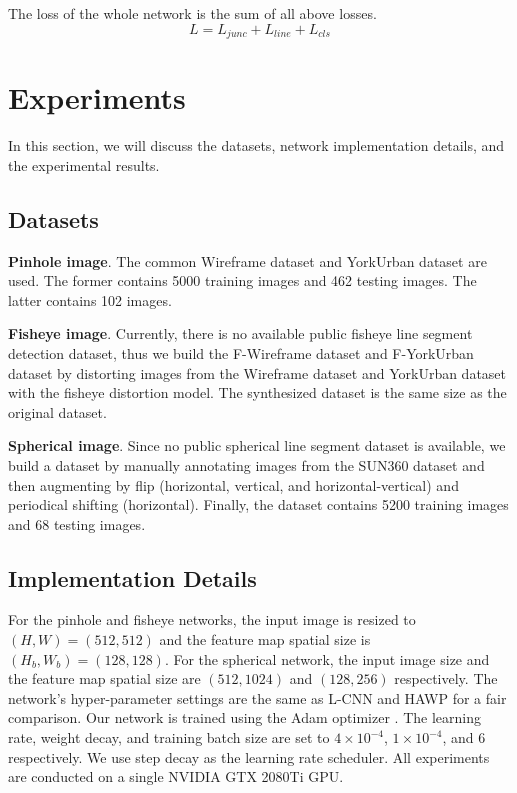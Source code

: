 \documentclass[letterpaper, 10 pt, conference]{ieeeconf}
\begin{document}
The loss of the whole network is the sum of all above losses.
\begin{equation} \label{eq9} 
	L=L_{junc}+L_{line}+L_{cls}
\end{equation}

\section{Experiments} \label{sec4} 
In this section, we will discuss the datasets, network implementation details, and the experimental results. 

\subsection{Datasets} \label{sec4-1} 
\noindent \textbf{Pinhole image}. The common Wireframe dataset \cite{DWP} and YorkUrban dataset \cite{YorkUrban} are used. The former contains 5000 training images and 462 testing images. The latter contains 102 images. 

\noindent \textbf{Fisheye image}. Currently, there is no available public fisheye line segment detection dataset, thus we build the F-Wireframe dataset and F-YorkUrban dataset by distorting images from the Wireframe dataset and YorkUrban dataset with the fisheye distortion model. The synthesized dataset is the same size as the original dataset. 

\noindent \textbf{Spherical image}. Since no public spherical line segment dataset is available, we build a dataset by manually annotating images from the SUN360 dataset \cite{SUN360} and then augmenting by flip (horizontal, vertical, and horizontal-vertical) and periodical shifting (horizontal). Finally, the dataset contains 5200 training images and 68 testing images.

\subsection{Implementation Details} \label{sec4-2} 
For the pinhole and fisheye networks, the input image is resized to $(H,W)=(512,512)$ and the feature map spatial size is $(H_b,W_b)=(128,128)$. For the spherical network, the input image size and the feature map spatial size are $(512,1024)$ and $(128,256)$ respectively. The network's hyper-parameter settings are the same as L-CNN and HAWP for a fair comparison. Our network is trained using the Adam optimizer \cite{Adam}. The learning rate, weight decay, and training batch size are set to $4 \times 10^{-4}$, $1 \times 10^{-4}$, and $6$ respectively. We use step decay as the learning rate scheduler. All experiments are conducted on a single NVIDIA GTX 2080Ti GPU.
\end{document}
